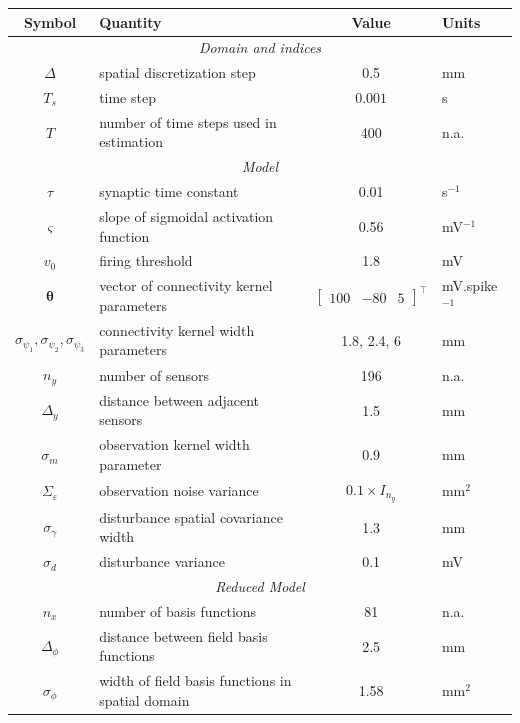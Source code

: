 \documentclass[review,authoryear,3p]{elsarticle}
\begin{document}
\clearpage
\newpage
\begin{table}[!ht]
\begin{tabular}{|c|l|c|l|}
	\hline
	\textbf{Symbol} & \textbf{Quantity} & \textbf{Value} & \textbf{Units}\\
	\hline
	\multicolumn{4}{|c|}{\emph{Domain and indices}}\\
	\hline
	$\Delta$ & spatial discretization step & 0.5 & mm \\
	$T_s$ & time step & $0.001$ & s\\
	$T$ & number of time steps used in estimation & 400 & n.a.\\
	\hline 
\multicolumn{4}{|c|}{\emph{Model}}\\
	\hline
	$\tau$ & synaptic time constant & 0.01 & s$^{-1}$ \\
	$\varsigma$ & slope of sigmoidal activation function & 0.56 \citep{Wendling2005} & mV$^{-1}$\\
	$v_0$ & firing threshold & 1.8 \citep{Marreiros2008} & mV  \\
	$\boldsymbol{\theta}$ & vector of connectivity kernel parameters & $\left[\begin{array}{ccc}
	100 &-80 &5
	\end{array}
	\right]^{\top}$ & mV.spike$^{-1}$\\
	$\sigma_{\psi_{1}}, \sigma_{\psi_{2}}, \sigma_{\psi_{3}}$ & connectivity kernel width parameters & 1.8, 2.4, 6 & mm\\
	$n_y$ & number of sensors & 196 & n.a.\\ 
	$\Delta_y$ & distance between adjacent sensors & 1.5 & mm\\
	$\sigma_{m}$ & observation kernel width parameter & 0.9 & mm \\
	$\Sigma_{\varepsilon}$ & observation noise variance & $0.1 \times I_{n_y}$ & mm$^2$ \\
	$\sigma_{\gamma}$& disturbance spatial covariance width & 1.3 & mm\\
	$\sigma_{d}$ & disturbance variance & 0.1 & mV \\
	\hline 
	\multicolumn{4}{|c|}{\emph{Reduced Model}}\\
	\hline
	$n_x$ & number of basis functions& 81 & n.a.\\
	$\Delta_{\phi}$ & distance between field basis functions & 2.5 & mm \\
	$\sigma_{\phi}$ & width of field basis functions in spatial domain & 1.58 & mm$^2$\\

\end{tabular}
\end{table}
\end{document}
